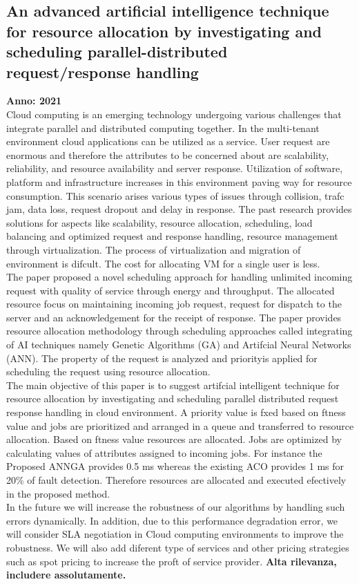 \subsection{An advanced artificial intelligence technique for resource allocation by investigating and scheduling parallel-distributed request/response handling}
\textbf{Anno: 2021}~\cite{geetha2021advanced}\\
Cloud computing is an emerging technology undergoing various challenges that integrate parallel and distributed computing together. 
In the multi-tenant environment cloud applications can be utilized as a service. 
User request are enormous and therefore the attributes to be concerned about are scalability, reliability, and resource availability and server response.
Utilization of software, platform and infrastructure increases in this environment paving way for resource consumption. 
This scenario arises various types of issues through collision, trafc jam, data loss, request dropout and delay in response. 
The past research provides solutions for aspects like scalability, resource allocation, scheduling, load balancing and optimized
request and response handling, resource management through virtualization. The process of virtualization and migration of
environment is difcult. The cost for allocating VM for a single user is less. \\
The paper proposed a novel scheduling approach for handling unlimited incoming request with quality of service through energy and throughput. 
The allocated resource focus on maintaining incoming job request, request for dispatch to the server and an acknowledgement for the receipt of response.
The paper provides resource allocation methodology through scheduling approaches called integrating of AI techniques
namely Genetic Algorithms (GA) and Artifcial Neural Networks (ANN). 
The property of the request is analyzed and priorityis applied for scheduling the request using resource allocation.\\

The main objective of this paper is to suggest artifcial intelligent technique for resource allocation by investigating and scheduling parallel distributed request response
handling in cloud environment. 
A priority value is fxed based on ftness value and jobs are prioritized and arranged
in a queue and transferred to resource allocation. Based on ftness value resources are allocated.
Jobs are optimized by calculating values of attributes assigned to incoming jobs. 
For instance the Proposed ANNGA provides 0.5 ms whereas the existing ACO provides 1 ms for 20\% of fault detection. 
Therefore resources are allocated and executed efectively in the proposed method.\\
In the future we will increase the robustness of our algorithms by handling such errors dynamically. In addition, due
to this performance degradation error, we will consider SLA negotiation in Cloud computing environments to improve the robustness. 
We will also add diferent type of services and other pricing strategies such as spot pricing to increase the proft of service provider.
\textbf{Alta rilevanza, includere assolutamente.}


